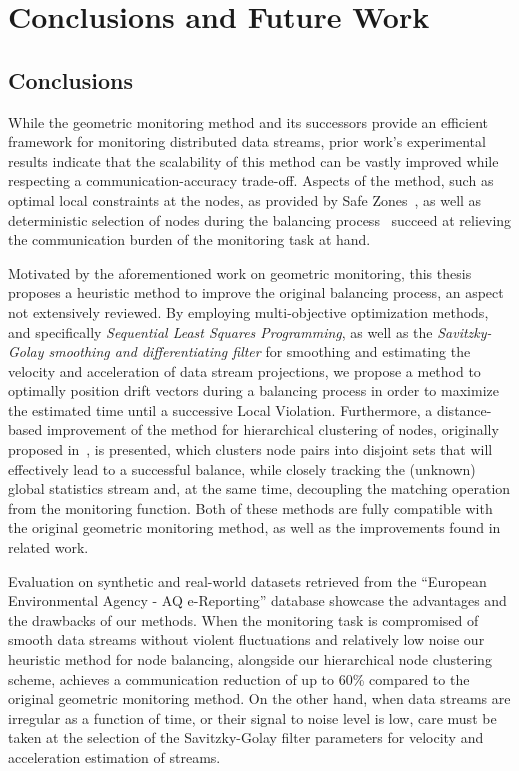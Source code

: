 \chapter{Conclusions and Future Work} \label{chap:concFuture}

\section{Conclusions} \label{sec:concFuture-conc}

While the geometric monitoring method and its successors provide an efficient framework for monitoring distributed data streams, prior work's experimental results indicate that the scalability of this method can be vastly improved while respecting a communication-accuracy trade-off. Aspects of the method, such as optimal local constraints at the nodes, as provided by Safe Zones~\cite{Keren2013SafeZones}, as well as deterministic selection of nodes during the balancing process~\cite{Keren2014GMHetStreams} succeed at relieving the communication burden of the monitoring task at hand.

Motivated by the aforementioned work on geometric monitoring, this thesis proposes a heuristic method to improve the original balancing process, an aspect not extensively reviewed. By employing multi-objective optimization methods, and specifically \emph{Sequential Least Squares Programming}, as well as the \emph{Savitzky-Golay smoothing and differentiating filter} for smoothing and estimating the velocity and acceleration of data stream projections, we propose a method to optimally position drift vectors during a balancing process in order to maximize the estimated time until a successive Local Violation. Furthermore, a distance-based improvement of the method for hierarchical clustering of nodes, originally proposed in~\cite{Keren2014GMHetStreams}, is presented, which clusters node pairs into disjoint sets that will effectively lead to a successful balance, while closely tracking the (unknown) global statistics stream and, at the same time, decoupling the matching operation from the monitoring function. Both of these methods are fully compatible with the original geometric monitoring method, as well as the improvements found in related work.

Evaluation on synthetic and real-world datasets retrieved from the ``European Environmental Agency - AQ e-Reporting'' database showcase the advantages and the drawbacks of our methods. When the monitoring task is compromised of smooth data streams without violent fluctuations and relatively low noise our heuristic method for node balancing, alongside our hierarchical node clustering scheme, achieves a communication reduction of up to 60\% compared to the original geometric monitoring method. On the other hand, when data streams are irregular as a function of time, or their signal to noise level is low, care must be taken at the selection of the Savitzky-Golay filter parameters for velocity and acceleration estimation of streams.


